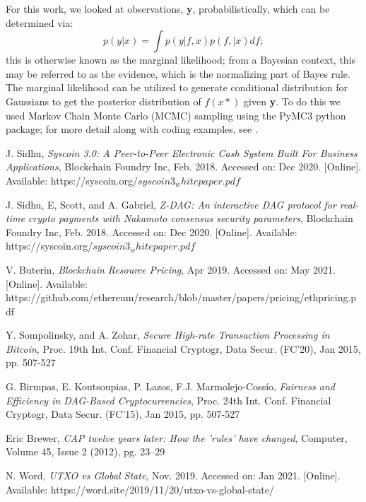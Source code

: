 \documentclass[peerreview]{ieeesyscoin}
\begin{document}
For this work, we looked at observations, \textbf{y}, probabilistically, which can be determined via:
\begin{equation}
p(y|x) = \int p(y | f,x) p (f, |x) df;
\end{equation}
this is otherwise known as the marginal likelihood; from a Bayesian context, this may be referred to as the evidence, which is the normalizing part of Bayes rule. The marginal likelihood can be utilized to generate conditional distribution for Gaussians to get the posterior distribution of $f(x*)$ given \textbf{y}. To do this we used Markov Chain Monte Carlo (MCMC) sampling using the PyMC3 python package; for more detail along with coding examples, see \cite{Fon20}.

\begin{thebibliography}{00}


 J. Sidhu, \textit{Syscoin 3.0: A Peer-to-Peer Electronic Cash System Built For Business Applications}, Blockchain Foundry Inc, Feb. 2018. Accessed on: Dec 2020. [Online]. Available: https://syscoin.org/$syscoin3_whitepaper.pdf$

 J. Sidhu, E, Scott, and A. Gabriel, \textit{Z-DAG: An interactive DAG protocol for real-time crypto payments with Nakamoto consensus security parameters}, Blockchain Foundry Inc, Feb. 2018. Accessed on: Dec 2020. [Online]. Available: https://syscoin.org/$syscoin3_whitepaper.pdf$

 V. Buterin,  \textit{Blockchain Resource Pricing}, Apr 2019. Accessed on: May 2021. [Online]. Available: https://github.com/ethereum/research/blob/master/papers/pricing/ethpricing.pdf

 Y. Sompolinsky, and A. Zohar, \textit{Secure High-rate Transaction Processing in Bitcoin}, Proc. 19th Int. Conf. Financial Cryptogr, Data Secur. (FC’20), Jan 2015, pp. 507-527

 G. Birmpas, E. Koutsoupias, P. Lazos, F.J. Marmolejo-Cossío, \textit{Fairness and Efficiency in DAG-Based Cryptocurrencies}, Proc. 24th Int. Conf. Financial Cryptogr, Data Secur. (FC’15), Jan 2015, pp. 507-527

 Eric Brewer, \textit{CAP twelve years later: How the 'rules' have changed}, Computer, Volume 45, Issue 2 (2012), pg. 23–29

 N. Word, \textit{UTXO vs Global State}, Nov. 2019. Accessed on: Jan 2021. [Online]. Available: https://word.site/2019/11/20/utxo-vs-global-state/


\end{thebibliography}
\end{document}
